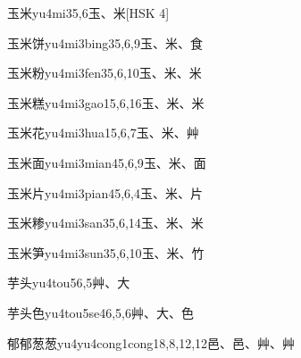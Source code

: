 \begin{entry}{玉米}{yu4mi3}{5,6}{⽟、⽶}[HSK 4]
\end{entry}

\begin{entry}{玉米饼}{yu4mi3bing3}{5,6,9}{⽟、⽶、⾷}
\end{entry}

\begin{entry}{玉米粉}{yu4mi3fen3}{5,6,10}{⽟、⽶、⽶}
\end{entry}

\begin{entry}{玉米糕}{yu4mi3gao1}{5,6,16}{⽟、⽶、⽶}
\end{entry}

\begin{entry}{玉米花}{yu4mi3hua1}{5,6,7}{⽟、⽶、⾋}
\end{entry}

\begin{entry}{玉米面}{yu4mi3mian4}{5,6,9}{⽟、⽶、⾯}
\end{entry}

\begin{entry}{玉米片}{yu4mi3pian4}{5,6,4}{⽟、⽶、⽚}
\end{entry}

\begin{entry}{玉米糁}{yu4mi3san3}{5,6,14}{⽟、⽶、⽶}
\end{entry}

\begin{entry}{玉米笋}{yu4mi3sun3}{5,6,10}{⽟、⽶、⽵}
\end{entry}

\begin{entry}{芋头}{yu4tou5}{6,5}{⾋、⼤}
\end{entry}

\begin{entry}{芋头色}{yu4tou5se4}{6,5,6}{⾋、⼤、⾊}
\end{entry}

\begin{entry}{郁郁葱葱}{yu4yu4cong1cong1}{8,8,12,12}{⾢、⾢、⾋、⾋}
\end{entry}

